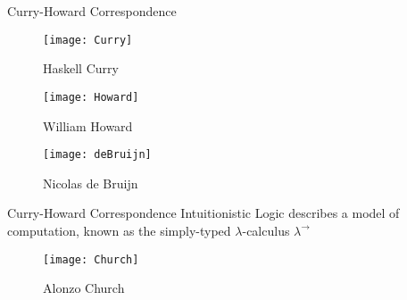 \documentclass{beamer}
\begin{document}
\begin{frame}{Curry-Howard Correspondence}
	\begin{minipage}[b]{0.33\textwidth}
		\begin{figure}
		\texttt{[image: Curry]}
		\caption{Haskell Curry}
		\end{figure}
	\end{minipage}%
	\begin{minipage}[b]{0.33\textwidth}
		\begin{figure}
		\texttt{[image: Howard]}
		\caption{William Howard}
		\end{figure}
	\end{minipage}%
	\begin{minipage}[b]{0.33\textwidth}
		\begin{figure}
		\texttt{[image: deBruijn]}
		\caption{Nicolas de Bruijn}
		\end{figure}
	\end{minipage}
	
	\vfill
	
	\begin{minipage}[b]{0.66\textwidth}
	\begin{block}{Curry-Howard Correspondence}
		Intuitionistic Logic describes a model of computation, known as
		the \alert{simply-typed $\lambda$-calculus $\lambda^\to$}
		
	\end{block}
	\end{minipage}%
	\begin{minipage}{0.33\textwidth}
		\begin{figure}
		\texttt{[image: Church]}
		\caption{Alonzo Church}
		\end{figure}
	\end{minipage}

\end{frame}
\end{document}
